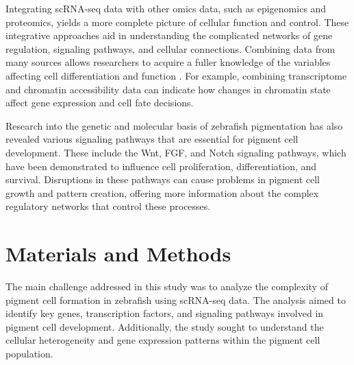 \documentclass[runningheads]{llncs}
\begin{document}
Integrating scRNA-seq data with other omics data, such as epigenomics and proteomics, yields a more complete picture of cellular function and control. These integrative approaches aid in understanding the complicated networks of gene regulation, signaling pathways, and cellular connections. Combining data from many sources allows researchers to acquire a fuller knowledge of the variables affecting cell differentiation and function \cite{stuart2019comprehensive,jang2021epigenetic}. For example, combining transcriptome and chromatin accessibility data can indicate how changes in chromatin state affect gene expression and cell fate decisions.

Research into the genetic and molecular basis of zebrafish pigmentation has also revealed various signaling pathways that are essential for pigment cell development. These include the Wnt, FGF, and Notch signaling pathways, which have been demonstrated to influence cell proliferation, differentiation, and survival\cite{budi2008embryonic}. Disruptions in these pathways can cause problems in pigment cell growth and pattern creation, offering more information about the complex regulatory networks that control these processes\cite{camargo2019endothelin}.

\section{Materials and Methods}
The main challenge addressed in this study was to analyze the complexity of pigment cell formation in zebrafish using scRNA-seq data. The analysis aimed to identify key genes, transcription factors, and signaling pathways involved in pigment cell development. Additionally, the study sought to understand the cellular heterogeneity and gene expression patterns within the pigment cell population.
\end{document}
